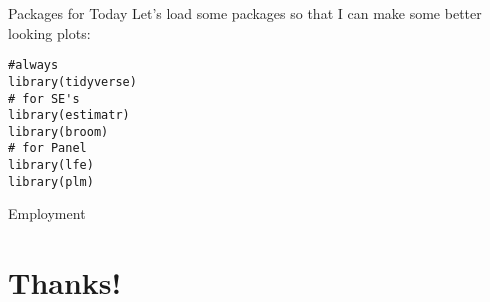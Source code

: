 \documentclass[aspectratio=169]{beamer}
\begin{document}
\begin{frame}[fragile]{Packages for Today}
Let's load some packages so that I can make some better looking plots:\\
\begin{verbatim}
#always
library(tidyverse)
# for SE's
library(estimatr)
library(broom)
# for Panel
library(lfe)
library(plm)
\end{verbatim}
\end{frame}




\begin{frame}{Employment}
\begin{center}
\end{center}
\end{frame}







\section*{Thanks!}
\end{document}
